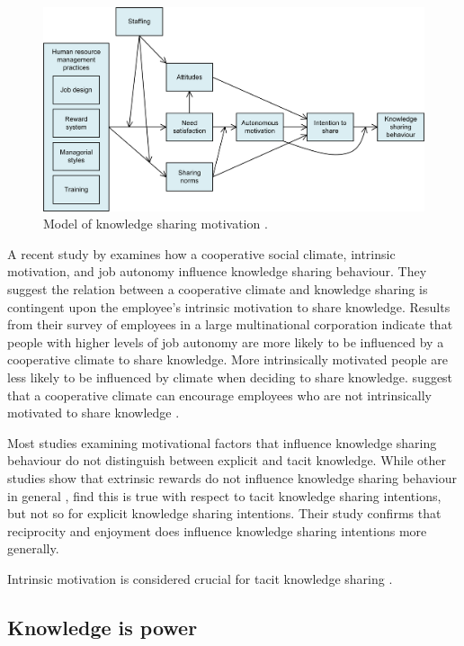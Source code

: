 \begin{figure}
	\centering
	\includegraphics[width=0.9\linewidth]{Images/gagne_model}
	\caption{Model of knowledge sharing motivation \citep{gagne2009model}.}
	\label{fig:gagnemodel}
\end{figure}

A recent study by \citet{llopis2016understanding} examines how a cooperative social climate, intrinsic motivation, and job autonomy influence knowledge sharing behaviour. They suggest the relation between a cooperative climate and knowledge sharing is contingent upon the employee's intrinsic motivation to share knowledge. Results from their survey of employees in a large multinational corporation indicate that people with higher levels of job autonomy are more likely to be influenced by a cooperative climate to share knowledge. More intrinsically motivated people are less likely to be influenced by climate when deciding to share knowledge. \citet{llopis2016understanding} suggest that a cooperative climate can encourage employees who are not intrinsically motivated to share knowledge . \medskip

Most studies examining motivational factors that influence knowledge sharing behaviour do not distinguish between explicit and tacit knowledge. While other studies show that extrinsic rewards do not influence knowledge sharing behaviour in general \citep[e.g.][]{bock2001breaking,bock2005behavioral,lin2007effects}, \citet{hau2013effects} find this is true with respect to tacit knowledge sharing intentions, but not so for explicit knowledge sharing intentions. Their study confirms that reciprocity and enjoyment does influence knowledge sharing intentions more generally. \medskip

Intrinsic motivation is considered crucial for tacit knowledge sharing \citep{osterloh2000motivation}. 

\subsection{Knowledge is power}

